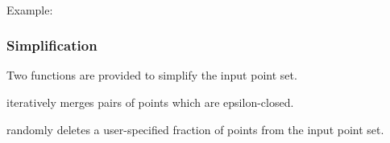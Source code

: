   \\


Example:



\subsubsection{Simplification}

Two functions are provided to simplify the input point set.

 iteratively merges pairs of points which are epsilon-closed.

 randomly deletes a user-specified fraction of points from the input point set.

  \\
  \\


